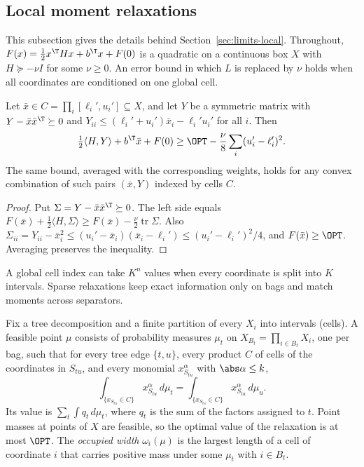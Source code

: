 \subsection{Local moment relaxations}\label{app:moments}

This subsection gives the details behind Section~\ref{sec:limits-local}.
Throughout, $F(x)=\frac12x^\T Hx+b^\T x+F(0)$ is a quadratic on a continuous box
$X$ with $H\succeq-\nu I$ for some $\nu\ge0$. An error bound in which $L$ is
replaced by $\nu$ holds when all coordinates are conditioned on one global
cell.

\begin{lemma}\label{lim:lem:mixture}
Let $\bar x\in C=\prod_i[\ell_i',u_i']\subseteq X$, and let $Y$ be a symmetric
matrix with $Y-\bar x\bar x^\T\succeq0$ and
$Y_{ii}\le(\ell_i'+u_i')\bar x_i-\ell_i'u_i'$ for all $i$. Then
\[
\tfrac12\langle H,Y\rangle+b^\T\bar x+F(0)\ge\OPT-\frac\nu8\sum_i(u_i'-\ell_i')^2 .
\]
The same bound, averaged with the corresponding weights, holds for any
convex combination of such pairs $(\bar x,Y)$ indexed by cells $C$.
\end{lemma}

\begin{proof}
Put $\Sigma=Y-\bar x\bar x^\T\succeq0$. The left side equals
$F(\bar x)+\frac12\langle H,\Sigma\rangle\ge F(\bar x)-\frac\nu2\operatorname{tr}\Sigma$.
Also $\Sigma_{ii}=Y_{ii}-\bar x_i^2\le(u_i'-\bar x_i)(\bar x_i-\ell_i')
\le(u_i'-\ell_i')^2/4$, and $F(\bar x)\ge\OPT$. Averaging preserves the
inequality.
\end{proof}

A global cell index can take $K^n$ values when every coordinate is split into
$K$ intervals. Sparse relaxations keep exact information only on bags and
match moments across separators.

\begin{definition}\label{lim:def:moments}
Fix a tree decomposition and a finite partition of every $X_i$ into intervals
(cells). A feasible point $\mu$ consists of probability measures $\mu_t$ on
$X_{B_t}=\prod_{i\in B_t}X_i$, one per bag, such that for every tree edge
$\{t,u\}$, every product $C$ of cells of the coordinates in $S_{tu}$, and
every monomial $x_{S_{tu}}^\alpha$ with $\abs\alpha\le k$,
\[
\int_{\{x_{S_{tu}}\in C\}}x_{S_{tu}}^\alpha\,d\mu_t
=\int_{\{x_{S_{tu}}\in C\}}x_{S_{tu}}^\alpha\,d\mu_u .
\]
Its value is $\sum_t\int q_t\,d\mu_t$, where $q_t$ is the sum of the factors
assigned to $t$. Point masses at points of $X$ are feasible, so the optimal
value of the relaxation is at most $\OPT$. The \emph{occupied width}
$\omega_i(\mu)$ is the largest length of a cell of coordinate $i$ that carries
positive mass under some $\mu_t$ with $i\in B_t$.
\end{definition}

